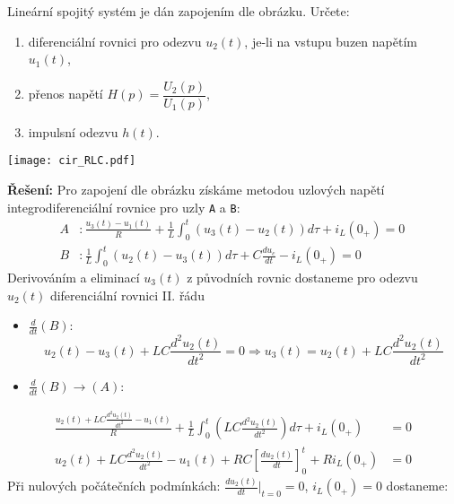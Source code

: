\begin{example}Lineární spojitý systém je dán zapojením dle obrázku. Určete:
  \begin{enumerate}
    \item diferenciální rovnici pro odezvu $u_2(t)$, je-li na vstupu buzen napětím $u_1(t)$,
    \item přenos napětí $H(p)=\dfrac{U_2(p)}{U_1(p)}$,
    \item impulsní odezvu $h(t)$.
  \end{enumerate}

   {\centering
    \texttt{[image: cir\_RLC.pdf]}
    \label{SAS:fig_RLC}
    \par}
  \textbf{Řešení:}\newline
  Pro zapojení dle obrázku získáme metodou uzlových napětí integrodiferenciální rov\-ni\-ce pro
  uzly \texttt{A} a \texttt{B}:
  \begin{align}\label{SAS:eq_RLC_basic_rces}
    A &:  \frac{u_3(t)-u_1(t)}{R}+\frac{1}{L}
    \int_0^t{(u_3(t)-u_2(t))}d\tau+i_L(0_+) = 0\,               \\ \nonumber
    B &:  \frac{1}{L}\int_0^t{(u_2(t)-u_3(t))}d\tau+C\frac{du_c}{dt}-i_L(0_+)        = 0
  \end{align}
  Derivováním a eliminací $u_3(t)$ z původních rovnic dostaneme pro odezvu $u_2(t)$ diferenciální
  rovnici II. řádu
  \begin{itemize}
    \item \(\frac{d}{dt}(B)\):
          \begin{equation*}
            u_2(t)-u_3(t)+LC\frac{d^2u_2(t)}{dt^2}
            =0\Rightarrow u_3(t)=u_2 (t)+LC\frac{d^2u_2(t)}{dt^2}
          \end{equation*}
    \item \(\frac{d}{dt}(B)\rightarrow(A)\):
  \end{itemize}
  \begin{align*}
    \frac{u_2(t)+LC\frac{d^2u_2(t)}{dt^2}-u_1(t)}{R}+
    \frac{1}{L}\int_0^t{(LC\frac{d^2u_2(t)}{dt^2})}d\tau+i_L(0_+) &=  0 \\
    u_2(t)+LC\frac{d^2u_2(t)}{dt^2}-u_1(t)+
    RC\left[\frac{du_2(t)}{dt}\right]_0^t+Ri_L(0_+)               &=  0
  \end{align*}
  Při nulových počátečních podmínkách: $\frac{du_2(t)}{dt}|_{t=0}=0$, $i_L(0_+)=0$ dostaneme:

\end{example}
